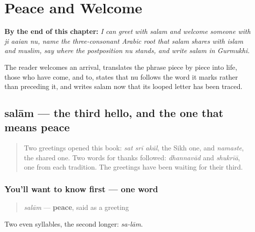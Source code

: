 
\chapter{Peace and Welcome}
\label{ch:pa-peace-and-welcome}

\begin{chapteropening}
\textbf{By the end of this chapter:} \emph{I can greet with salam and welcome someone with ji aaian nu, name the three-consonant Arabic root that salam shares with islam and muslim, say where the postposition nu stands, and write salam in Gurmukhi.}

The reader welcomes an arrival, translates the phrase piece by piece into life, those who have come, and to, states that nu follows the word it marks rather than preceding it, and writes salam now that its looped letter has been traced.
\end{chapteropening}

\section[\texorpdfstring{\pa{ਸਲਾਮ} (salām)}{ਸਲਾਮ (salām)}]{salām — the third hello, and the one that means peace}

\label{lesson:PA-C34-salaam}



\begin{quote}
Two greetings opened this book: \emph{sat srī akāl}, the Sikh one, and \emph{namaste}, the shared one. Two words for thanks followed: \emph{dhannavād} and \emph{shukrīā}, one from each tradition. The greetings have been waiting for their third.
\end{quote}

\subsection*{You'll want to know first — one word}
\begin{quote}
\emph{salām} — \textbf{peace}, said as a greeting
\end{quote}

Two even syllables, the second longer: \emph{sa-lām}.

